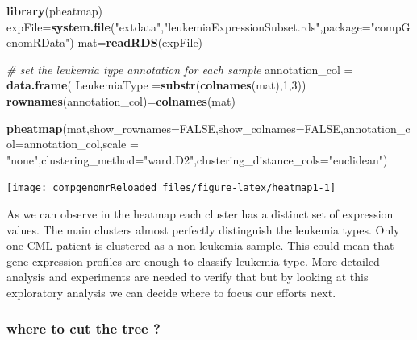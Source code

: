\documentclass[12pt,]{krantz}
\newenvironment{Shaded}{\begin{snugshade}}{\end{snugshade}}
\newcommand{\CommentTok}[1]{\textcolor[rgb]{0.56,0.35,0.01}{\textit{#1}}}
\newcommand{\DataTypeTok}[1]{\textcolor[rgb]{0.13,0.29,0.53}{#1}}
\newcommand{\DecValTok}[1]{\textcolor[rgb]{0.00,0.00,0.81}{#1}}
\newcommand{\KeywordTok}[1]{\textcolor[rgb]{0.13,0.29,0.53}{\textbf{#1}}}
\newcommand{\NormalTok}[1]{#1}
\newcommand{\OtherTok}[1]{\textcolor[rgb]{0.56,0.35,0.01}{#1}}
\newcommand{\StringTok}[1]{\textcolor[rgb]{0.31,0.60,0.02}{#1}}
\begin{document}
\begin{Shaded}
\begin{Highlighting}[]
\KeywordTok{library}\NormalTok{(pheatmap)}
\NormalTok{expFile=}\KeywordTok{system.file}\NormalTok{(}\StringTok{"extdata"}\NormalTok{,}\StringTok{"leukemiaExpressionSubset.rds"}\NormalTok{,}\DataTypeTok{package=}\StringTok{"compGenomRData"}\NormalTok{)}
\NormalTok{mat=}\KeywordTok{readRDS}\NormalTok{(expFile)}

\CommentTok{# set the leukemia type annotation for each sample}
\NormalTok{annotation_col =}\StringTok{ }\KeywordTok{data.frame}\NormalTok{(}
                    \DataTypeTok{LeukemiaType =}\KeywordTok{substr}\NormalTok{(}\KeywordTok{colnames}\NormalTok{(mat),}\DecValTok{1}\NormalTok{,}\DecValTok{3}\NormalTok{))}
\KeywordTok{rownames}\NormalTok{(annotation_col)=}\KeywordTok{colnames}\NormalTok{(mat)}
  

\KeywordTok{pheatmap}\NormalTok{(mat,}\DataTypeTok{show_rownames=}\OtherTok{FALSE}\NormalTok{,}\DataTypeTok{show_colnames=}\OtherTok{FALSE}\NormalTok{,}\DataTypeTok{annotation_col=}\NormalTok{annotation_col,}\DataTypeTok{scale =} \StringTok{"none"}\NormalTok{,}\DataTypeTok{clustering_method=}\StringTok{"ward.D2"}\NormalTok{,}\DataTypeTok{clustering_distance_cols=}\StringTok{"euclidean"}\NormalTok{)}
\end{Highlighting}
\end{Shaded}

\begin{center}\texttt{[image: compgenomrReloaded\_files/figure-latex/heatmap1-1]} \end{center}

As we can observe in the heatmap each cluster has a distinct set of expression values. The main clusters almost perfectly distinguish the leukemia types. Only one CML patient is clustered as a non-leukemia sample. This could mean that gene expression profiles are enough to classify leukemia type. More detailed analysis and experiments are needed to verify that but by looking at this exploratory analysis we can decide where to focus our efforts next.

\hypertarget{where-to-cut-the-tree}{%
\subsubsection{where to cut the tree ?}\label{where-to-cut-the-tree}}
\end{document}

